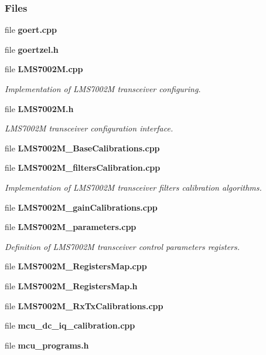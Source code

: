\subsubsection*{Files}
\begin{DoxyCompactItemize}
\item 
file {\bf goert.\+cpp}
\item 
file {\bf goertzel.\+h}
\item 
file {\bf L\+M\+S7002\+M.\+cpp}
\begin{DoxyCompactList}\small\item\em Implementation of L\+M\+S7002M transceiver configuring. \end{DoxyCompactList}\item 
file {\bf L\+M\+S7002\+M.\+h}
\begin{DoxyCompactList}\small\item\em L\+M\+S7002M transceiver configuration interface. \end{DoxyCompactList}\item 
file {\bf L\+M\+S7002\+M\+\_\+\+Base\+Calibrations.\+cpp}
\item 
file {\bf L\+M\+S7002\+M\+\_\+filters\+Calibration.\+cpp}
\begin{DoxyCompactList}\small\item\em Implementation of L\+M\+S7002M transceiver filters calibration algorithms. \end{DoxyCompactList}\item 
file {\bf L\+M\+S7002\+M\+\_\+gain\+Calibrations.\+cpp}
\item 
file {\bf L\+M\+S7002\+M\+\_\+parameters.\+cpp}
\begin{DoxyCompactList}\small\item\em Definition of L\+M\+S7002M transceiver control parameters registers. \end{DoxyCompactList}\item 
file {\bf L\+M\+S7002\+M\+\_\+\+Registers\+Map.\+cpp}
\item 
file {\bf L\+M\+S7002\+M\+\_\+\+Registers\+Map.\+h}
\item 
file {\bf L\+M\+S7002\+M\+\_\+\+Rx\+Tx\+Calibrations.\+cpp}
\item 
file {\bf mcu\+\_\+dc\+\_\+iq\+\_\+calibration.\+cpp}
\item 
file {\bf mcu\+\_\+programs.\+h}
\end{DoxyCompactItemize}
